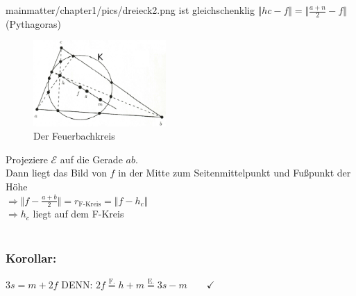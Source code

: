 \begin{enumerate}
	{mainmatter/chapter1/pics/dreieck2.png} ist gleichschenklig $\Vert hc-f \Vert = \Vert 
	\frac{a+n}{2} -f \Vert$ (Pythagoras)
	\begin{figure} [H]
	\centering
	\includegraphics[width=0.45\textwidth]
	{mainmatter/chapter1/pics/feuerbachkreis.png}
	\caption{Der Feuerbachkreis}
	\end{figure}
\end{enumerate}
Projeziere $\mathcal{E}$ auf die Gerade $ab$. \\
Dann liegt das Bild von $f$ in der Mitte zum Seitenmittelpunkt und Fußpunkt der Höhe\\
$\Rightarrow \Vert f-\frac{a+b}{2}\Vert = r_{\text{F-Kreis}}=\Vert f-h_{c} \Vert$\\
$\Rightarrow h_{c}$ liegt auf dem F-Kreis\\
\qquad\\
\subsubsection{Korollar:}
$3s=m+2f$ DENN: $2f \mathop{=}\limits^{\text{F.}}h+m \mathop{=}\limits^{\text{E.}}3s-m \qquad \checkmark$